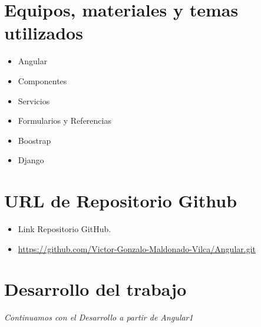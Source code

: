 \documentclass{article}
\begin{document}
		
	\section{Equipos, materiales y temas utilizados}
  \begin{itemize}
    \item Angular
    \item Componentes
    \item Servicios
    \item Formularios y Referencias
    \item Boostrap
    \item Django
  \end{itemize}
 

  \section{URL de Repositorio Github}
  \begin{itemize}
    \item Link Repositorio GitHub.
    \item \url{https://github.com/Victor-Gonzalo-Maldonado-Vilca/Angular.git}
  \end{itemize}


  \section{Desarrollo del trabajo}
  \textit{Continuamos con el Desarrollo a partir de Angular1}
  
\end{document}
